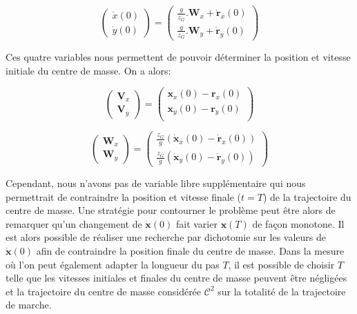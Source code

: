 \begin{equation}
  \left(
  \begin{array}{c}
    \dot{x}(0)\\
    \dot{y}(0)
  \end{array}
  \right) = \left(
  \begin{array}{c}
    \frac{g}{z_G} . \mathbf{W}_x + \dot{\mathbf{r}}_x(0)\\
    \frac{g}{z_G} . \mathbf{W}_y + \dot{\mathbf{r}}_y(0)
  \end{array}
  \right)
\end{equation}

Ces quatre variables nous permettent de pouvoir déterminer la position
et vitesse initiale du centre de masse. On a alors:

\begin{equation}
  \left(
  \begin{array}{c}
    \mathbf{V}_x\\
    \mathbf{V}_y
  \end{array}
  \right) = \left(
  \begin{array}{c}
    \mathbf{x}_x(0) - \mathbf{r}_x(0)\\
    \mathbf{x}_y(0) - \mathbf{r}_y(0)\\
  \end{array}
  \right)
\end{equation}

\begin{equation}
  \left(
  \begin{array}{c}
    \mathbf{W}_x\\
    \mathbf{W}_y
  \end{array}
  \right) = \left(
  \begin{array}{c}
    \frac{z_G}{g}(\dot{\mathbf{x}}_x(0) - \dot{\mathbf{r}}_x(0))\\
    \frac{z_G}{g}(\dot{\mathbf{x}}_y(0) - \dot{\mathbf{r}}_y(0))
  \end{array}
  \right)
\end{equation}

Cependant, nous n'avons pas de variable libre supplémentaire qui nous
permettrait de contraindre la position et vitesse finale ($t=T$) de la
trajectoire du centre de masse. Une stratégie pour contourner le
problème peut être alors de remarquer qu'un changement de
$\dot{\mathbf{x}}(0)$ fait varier $\mathbf{x}(T)$ de façon
monotone. Il est alors possible de réaliser une recherche par
dichotomie sur les valeurs de $\dot{\mathbf{x}}(0)$ afin de
contraindre la position finale du centre de masse. Dans la mesure où
l'on peut également adapter la longueur du pas $T$, il est possible de
choisir $T$ telle que les vitesses initiales et finales du centre de
masse peuvent être négligées et la trajectoire du centre de masse
considérée $\mathcal{C}^2$ sur la totalité de la trajectoire de
marche.


